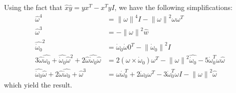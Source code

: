 \documentclass[]{article}
\newcommand{\norm}[1]{\left\| #1 \right\|}
\newcommand{\w}{\omega}
\newcommand{\dw}{\dot{\omega}}
\begin{document}
Using the fact that $\hat{x}\hat{y} = y x^T - x^T y I$, we have the following simplifications:
\begin{align*}
	\hat{\w}^4 &= \norm{\w}^4 I - \norm{\w}^2 \w\w^T \\
	\hat{\w}^3 &= -\norm{\w}^2 \hat{w} \\
	\widehat{\dw_0}^2 &= \dw_0 \dw0^T - \norm{\dw_0}^2 I\\
	3\hat{\w}\widehat{\dw_0} + \widehat{\dw_0}\hat{\w}^2 + 2\hat{\w}\widehat{\dw_0}\hat{\w} &= 2 (\w \times \dw_0) \w^T - \norm{\w}^2\widehat{\dw_0} - 5\dw_0^T\w \hat{\w}\\
	\widehat{\dw_0}\hat{\w} + 2\hat{\w}\widehat{\dw_0} + \hat{\w}^3 &= \w \dw_0^T + 2 \dw_0 \w^T - 3\dw_0^T\w I -\norm{\w}^2\hat{\w}
\end{align*}
which yield the result.
\end{document}
